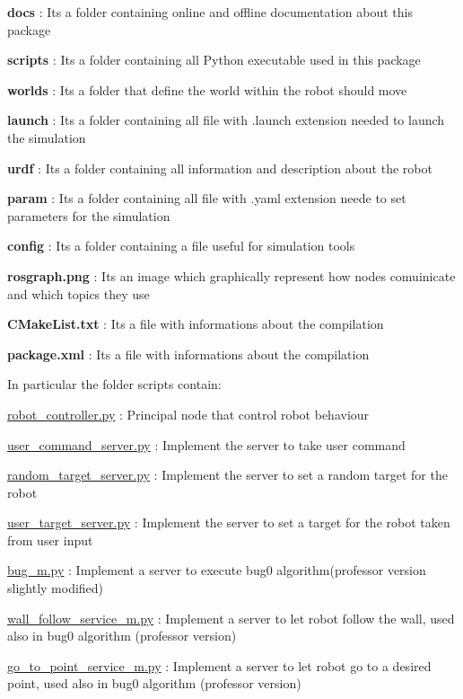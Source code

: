 \begin{DoxyItemize}
\item {\bfseries docs} \+: It\textquotesingle{}s a folder containing online and offline documentation about this package
\item {\bfseries scripts} \+: It\textquotesingle{}s a folder containing all Python executable used in this package
\item {\bfseries worlds} \+: It\textquotesingle{}s a folder that define the world within the robot should move
\item {\bfseries launch} \+: It\textquotesingle{}s a folder containing all file with .launch extension needed to launch the simulation
\item {\bfseries urdf} \+: It\textquotesingle{}s a folder containing all information and description about the robot
\item {\bfseries param} \+: It\textquotesingle{}s a folder containing all file with .yaml extension neede to set parameters for the simulation
\item {\bfseries config} \+: It\textquotesingle{}s a folder containing a file useful for simulation tools
\item {\bfseries rosgraph.\+png} \+: It\textquotesingle{}s an image which graphically represent how nodes comuinicate and which topics they use
\item {\bfseries C\+Make\+List.\+txt} \+: It\textquotesingle{}s a file with informations about the compilation
\item {\bfseries package.\+xml} \+: It\textquotesingle{}s a file with informations about the compilation
\end{DoxyItemize}

In particular the folder \textquotesingle{}scripts\textquotesingle{} contain\+:
\begin{DoxyItemize}
\item \hyperlink{robot__controller_8py}{robot\+\_\+controller.\+py} \+: Principal node that control robot behaviour
\item \hyperlink{user__command__server_8py}{user\+\_\+command\+\_\+server.\+py} \+: Implement the server to take user command
\item \hyperlink{random__target__server_8py}{random\+\_\+target\+\_\+server.\+py} \+: Implement the server to set a random target for the robot
\item \hyperlink{user__target__server_8py}{user\+\_\+target\+\_\+server.\+py} \+: Implement the server to set a target for the robot taken from user input
\item \hyperlink{bug__m_8py}{bug\+\_\+m.\+py} \+: Implement a server to execute bug0 algorithm(professor version slightly modified)
\item \hyperlink{wall__follow__service__m_8py}{wall\+\_\+follow\+\_\+service\+\_\+m.\+py} \+: Implement a server to let robot follow the wall, used also in bug0 algorithm (professor version)
\item \hyperlink{go__to__point__service__m_8py}{go\+\_\+to\+\_\+point\+\_\+service\+\_\+m.\+py} \+: Implement a server to let robot go to a desired point, used also in bug0 algorithm (professor version)
\end{DoxyItemize}

